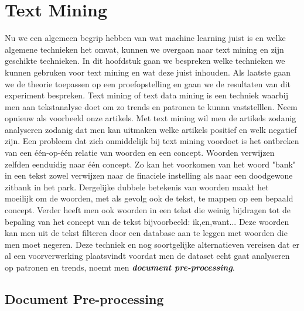 \chapter{Text Mining}\label{Text Mining}

Nu we een algemeen begrip hebben van wat machine learning juist is en welke algemene technieken het omvat, kunnen we overgaan naar text mining en zijn geschikte technieken. In dit hoofdstuk gaan we bespreken welke technieken we kunnen gebruken voor text mining en wat deze juist inhouden. Als laatste gaan we de theorie toepassen op een proefopstelling en gaan we de resultaten van dit experiment bespreken. 
\newline
%
Text mining of text data mining is een techniek waarbij men aan tekstanalyse doet om zo trends en patronen te kunnn vaststelllen. Neem opnieuw als voorbeeld onze artikels. Met text mining wil men de artikels zodanig analyseren zodanig dat men kan uitmaken welke artikels positief en welk negatief zijn.
Een probleem dat zich onmiddelijk bij text mining voordoet is het ontbreken van een  \'e\'en-op-\'e\'en relatie van woorden en een concept. Woorden verwijzen zelfden eenduidig naar \'e\'en concept. Zo kan het voorkomen van het woord "bank" in een tekst zowel verwijzen naar de finaciele instelling als naar een doodgewone zitbank in het park. Dergelijke dubbele betekenis van woorden maakt het moeilijk om de woorden, met als gevolg ook de tekst, te mappen op een bepaald concept.
% 
Verder heeft men ook woorden in een tekst die weinig bijdragen tot de bepaling van het concept van de tekst bijvoorbeeld: ik,en,want...
Deze woorden kan men uit de tekst filteren door een database aan te leggen met woorden die men moet negeren. Deze techniek en nog soortgelijke alternatieven vereisen dat er al een voorverwerking plaatsvindt voordat men de dataset echt gaat analyseren op patronen en trends, noemt men \textbf{\textit{document pre-processing}}.

\section{Document Pre-processing }\label{Document Pre-processing}

